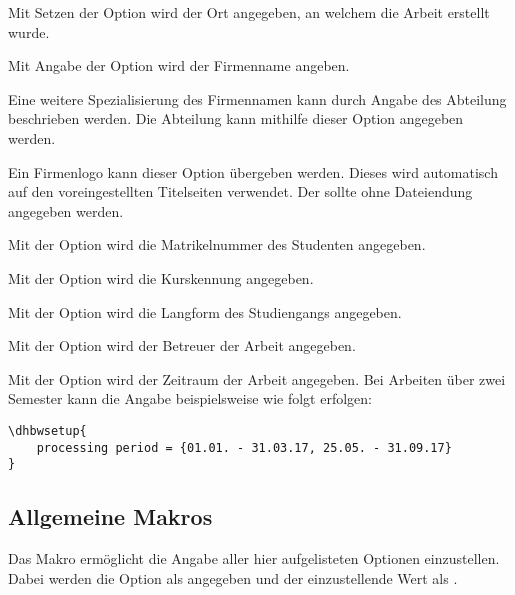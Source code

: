 \documentclass[babel=ngerman,highlight=false]{skdoc}
\begin{document}
            Mit Setzen der Option wird der Ort angegeben, an welchem die Arbeit erstellt wurde.\medskip

            Mit Angabe der Option wird der Firmenname angeben.\medskip

            Eine weitere Spezialisierung des Firmennamen kann durch Angabe des Abteilung beschrieben werden. Die Abteilung kann mithilfe dieser Option angegeben werden.\medskip

            Ein Firmenlogo kann dieser Option übergeben werden. Dieses wird automatisch auf den voreingestellten Titelseiten verwendet. Der  sollte ohne Dateiendung angegeben werden.\medskip

            Mit der Option wird die Matrikelnummer des Studenten angegeben.\medskip

            Mit der Option wird die Kurskennung angegeben.\medskip

            Mit der Option wird die Langform des Studiengangs angegeben.\medskip

            Mit der Option wird der Betreuer der Arbeit angegeben.\medskip

            Mit der Option wird der Zeitraum der Arbeit angegeben. Bei Arbeiten über zwei Semester kann die Angabe beispielsweise wie folgt erfolgen:
            \begin{verbatim}
\dhbwsetup{
    processing period = {01.01. - 31.03.17, 25.05. - 31.09.17}
}
            \end{verbatim}

        \subsection{Allgemeine Makros}\label{subsec:macro}
            \DescribeMacro{} Das Makro ermöglicht die Angabe aller hier aufgelisteten Optionen einzustellen. Dabei werden die Option als  angegeben und der einzustellende Wert als .
\end{document}
